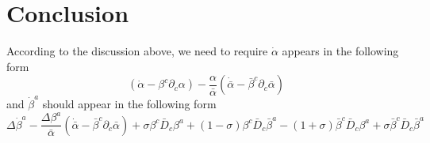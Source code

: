 \documentclass{article}
\begin{document}
\section{Conclusion}
According to the discussion above, we need to require ${\dot \alpha}$ appears in the following form
\[
\boxed{
({\dot \alpha} - \beta^{c}\partial_{c}\alpha) - \frac{\alpha}{{\bar \alpha}}({\dot {\bar \alpha}} - {\bar \beta}^{c} \partial_{c}{\bar \alpha})
}
\]
and ${\dot \beta}^{a}$ should appear in the following form
\[
\boxed{
\Delta {\dot \beta}^{a} - \frac{\Delta \beta^{a}}{{\bar \alpha}}({\dot {\bar \alpha}} - {\bar \beta}^{c}\partial_{c}{\bar \alpha}) + \sigma \beta^{c}{\bar D}_{c}\beta^{a} + (1 - \sigma)\beta^{c}{\bar D}_{c}{\bar \beta}^{a} - (1 + \sigma){\bar \beta}^{c}{\bar D}_{c}\beta^{a} + \sigma{\bar \beta}^{c}{\bar D}_{c}{\bar \beta}^{a} 
}
\]
\end{document}
